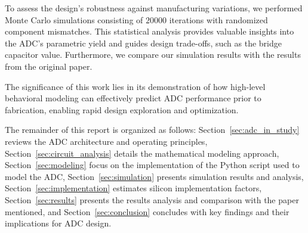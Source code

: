 To assess the design's robustness against manufacturing variations, we performed Monte Carlo simulations consisting of $20000$ iterations with randomized component mismatches. This statistical analysis provides valuable insights into the ADC's parametric yield and guides design trade-offs, such as the bridge capacitor value. Furthermore, we compare our simulation results with the results from the original paper.

The significance of this work lies in its demonstration of how high-level behavioral modeling can effectively predict ADC performance prior to fabrication, enabling rapid design exploration and optimization. 

The remainder of this report is organized as follows: Section~\ref{sec:adc_in_study} reviews the ADC architecture and operating principles, Section~\ref{sec:circuit_analysis} details the mathematical modeling approach, Section~\ref{sec:modeling} focus on the implementation of the Python script used to model the ADC, Section~\ref{sec:simulation} presents simulation results and analysis, Section~\ref{sec:implementation} estimates silicon implementation factors, Section~\ref{sec:results} presents the results analysis and comparison with the paper mentioned, and Section~\ref{sec:conclusion} concludes with key findings and their implications for ADC design. 

